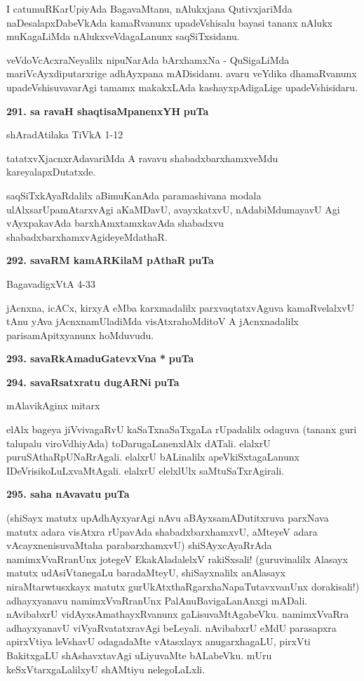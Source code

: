 I catumuRKarUpiyAda BagavaMtanu, nAlukxjana QutivxjariMda naDesalapxDabeVkAda kamaRvanunx upadeVshisalu bayasi tananx nAlukx muKagaLiMda nAlukxveVdagaLanunx saqSiTxsidanu.

veVdoVcAcxraNeyalilx nipuNarAda bArxhamxNa - QuSigaLiMda mariVcAyxdiputarxrige adhAyxpana mADisidanu. avaru veYdika dhamaRvanunx upadeVshisuvavarAgi tamamx makakxLAda kashayxpAdigaLige upadeVshisidaru.


\medskip
\noindent
\textbf{291. sa ravaH shaqtisaMpanenxYH} \hfill {\bf puTa }

\hfill shAradAtilaka TiVkA 1-12

\smallskip
tatatxvXjacnxrAdavariMda A ravavu shabadxbarxhamxveMdu kareyalapxDutatxde.

saqSiTxkAyaRdalilx aBimuKanAda paramashivana modala ulAlxsarUpamAtarxvAgi aKaMDavU, avayxkatxvU, nAdabiMdumayavU Agi vAyxpakavAda barxhAmxtamxkavAda shabadxvu shabadxbarxhamxvAgideyeMdathaR.

\noindent
\textbf{292. savaRM kamARKilaM pAthaR} \hfill {\bf puTa }

\hfill BagavadigxVtA 4-33

\smallskip
jAcnxna, icACx, kirxyA eMba karxmadalilx parxvaqtatxvAguva kamaRvelalxvU tAnu yAva jAcnxnamUladiMda visAtxrahoMditoV A jAcnxnadalilx parisamApitxyanunx hoMduvudu.

\medskip
\noindent
\textbf{293. savaRkAmaduGatevxVna *} \hfill {\bf puTa }

\smallskip
\noindent
\textbf{294. savaRsatxratu dugARNi} \hfill {\bf puTa }

\hfill mAlavikAginx mitarx

\smallskip
elAlx bageya jiVvivagaRvU kaSaTxnaSaTxgaLa rUpadalilx odaguva (tananx guri talupalu viroVdhiyAda) toDarugaLanenxlAlx dATali. elalxrU puruSAthaRpUNaRrAgali.  elalxrU bALinalilx apeVkiSxtagaLanunx IDeVrisikoLuLxvaMtAgali. elalxrU elelxlUlx saMtuSaTxrAgirali.

\medskip
\noindent
\textbf{295. saha nAvavatu} \hfill {\bf puTa }

\smallskip
(shiSayx matutx upAdhAyxyarAgi nAvu aBAyxsamADutitxruva parxNava matutx adara visAtxra rUpavAda shabadxbarxhamxvU, aMteyeV adara vAcayxnenisuvaMtaha parabarxhamxvU) shiSAyxcAyaRrAda namimxVvaRranUnx jotegeV EkakAladalelxV rakiSxsali! (guruvinalilx Alasayx matutx udAsiVtanegaLu baradaMteyU, shiSayxnalilx anAlasayx niraMtarwtusxkayx matutx gurUkAtxthaRgarxhaNapaTutavxvanUnx dorakisali!) adhayxyanavu namimxVvaRranUnx PalAnuBavigaLanAnxgi mADali. nAvibabxrU vidAyxsAmathayxRvanunx gaLisuvaMtAgabeVku. namimxVvaRra adhayxyanavU viVyaRvatatxravAgi beLeyali. nAvibabxrU eMdU parasapxra apirxVtiya leVshavU odagadaMte vAtasxlayx anugarxhagaLU, pirxVti BakitxgaLU shAshavxtavAgi uLiyuvaMte bALabeVku. mUru keSxVtarxgaLalilxyU shAMtiyu nelegoLaLxli.
 
